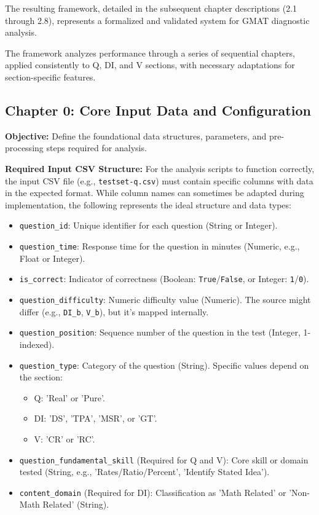\documentclass{article}
\begin{document}
The resulting framework, detailed in the subsequent chapter descriptions (2.1 through 2.8), represents a formalized and validated system for GMAT diagnostic analysis.

The framework analyzes performance through a series of sequential chapters, applied consistently to Q, DI, and V sections, with necessary adaptations for section-specific features.

\subsection{Chapter 0: Core Input Data and Configuration}

\textbf{Objective:} Define the foundational data structures, parameters, and pre-processing steps required for analysis.

\textbf{Required Input CSV Structure:}
For the analysis scripts to function correctly, the input CSV file (e.g., \texttt{testset-q.csv}) must contain specific columns with data in the expected format. While column names can sometimes be adapted during implementation, the following represents the ideal structure and data types:

\begin{itemize}
    \item \texttt{question\_id}: Unique identifier for each question (String or Integer).
    \item \texttt{question\_time}: Response time for the question in minutes (Numeric, e.g., Float or Integer).
    \item \texttt{is\_correct}: Indicator of correctness (Boolean: \texttt{True}/\texttt{False}, or Integer: \texttt{1}/\texttt{0}).
    \item \texttt{question\_difficulty}: Numeric difficulty value (Numeric). The source might differ (e.g., \texttt{DI\_b}, \texttt{V\_b}), but it's mapped internally.
    \item \texttt{question\_position}: Sequence number of the question in the test (Integer, 1-indexed).
    \item \texttt{question\_type}: Category of the question (String). Specific values depend on the section:
        \begin{itemize}
            \item Q: 'Real' or 'Pure'.
            \item DI: 'DS', 'TPA', 'MSR', or 'GT'.
            \item V: 'CR' or 'RC'.
        \end{itemize}
    \item \texttt{question\_fundamental\_skill} (Required for Q and V): Core skill or domain tested (String, e.g., 'Rates/Ratio/Percent', 'Identify Stated Idea').
    \item \texttt{content\_domain} (Required for DI): Classification as 'Math Related' or 'Non-Math Related' (String).
\end{itemize}
\end{document}
